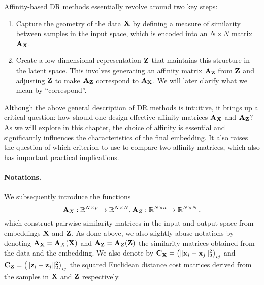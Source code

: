 Affinity-based DR methods essentially revolve around two key steps:

\begin{enumerate}
    \item Capture the geometry of the data ${\mathbf{X}}$ by defining a measure of similarity between samples in the input space, which is encoded into an $N \times N$ matrix ${\mathbf{A}}_{{\mathbf{X}}}$.
    \item Create a low-dimensional representation ${\mathbf{Z}}$ that maintains this structure in the latent space. This involves generating an affinity matrix ${\mathbf{A}}_{{\mathbf{Z}}}$ from ${\mathbf{Z}}$ and adjusting ${\mathbf{Z}}$ to make ${\mathbf{A}}_{{\mathbf{Z}}}$ correspond to ${\mathbf{A}}_{{\mathbf{X}}}$. We will later clarify what we mean by ``correspond''.
\end{enumerate}

Although the above general description of DR methods is intuitive, it brings up a critical question: how should one design effective affinity matrices ${\mathbf{A}}_{{\mathbf{X}}}$ and ${\mathbf{A}}_{{\mathbf{Z}}}$? As we will explore in this chapter, the choice of affinity is essential and significantly influences the characteristics of the final embedding. It also raises the question of which criterion to use to compare two affinity matrices, which also has important practical implications.

\paragraph{Notations.} We subsequently introduce the functions
\begin{equation}
\label{eq:sim_function}
{\mathbf{A}}_{X}: \mathbb{R}^{N \times p} \to \mathbb{R}^{N \times N}, {\mathbf{A}}_{Z}: \mathbb{R}^{N \times d} \to \mathbb{R}^{N \times N}\,,
\end{equation}
which construct pairwise similarity matrices in the input and output space from embeddings ${\mathbf{X}}$ and ${\mathbf{Z}}$. As done above, we also slightly abuse notations by denoting ${\mathbf{A}}_{\mathbf{X}} = {\mathbf{A}}_{X}({\mathbf{X}})$ and ${\mathbf{A}}_{\mathbf{Z}} = {\mathbf{A}}_{Z}({\mathbf{Z}})$ the similarity matrices obtained from the data and the embedding. We also denote by $\mathbf{C}_{\mathbf{X}} = \left(\|{\mathbf{x}}_{i}-{\mathbf{x}}_{j}\|_2^2\right)_{ij}$ and $\mathbf{C}_{\mathbf{Z}} = \left(\|{\mathbf{z}}_{i}-{\mathbf{z}}_{j}\|_2^2\right)_{ij}$ the squared Euclidean distance cost matrices derived from the samples in $\mathbf{X}$ and $\mathbf{Z}$ respectively.
 
